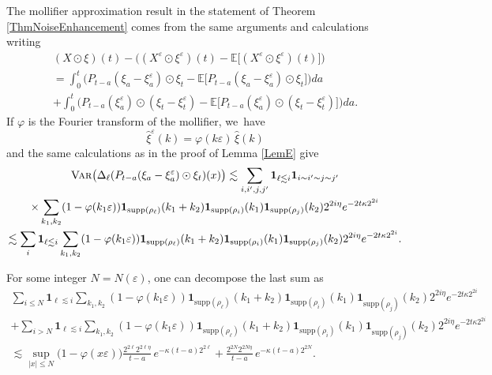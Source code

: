 \documentclass[10pt]{amsart}
\theoremstyle{definition}
\let\epsilon\varepsilon
\let\eps\epsilon
\newcommand\bbE{\mathbb{E}}
\newcommand{\bfone}{\mathbf{1}}
\begin{document}
The mollifier approximation result in the statement of Theorem \ref{ThmNoiseEnhancement} comes from the same arguments and calculations writing
\begin{multline*}
(X\odot\xi)(t) - \bigl((X^\eps\odot\xi^\eps)(t) - \bbE\bigl[(X^\eps\odot\xi^\eps)(t) \bigr]\bigr)
\\
= \int_0^t \bigl(P_{t-a}(\xi_a - \xi_a^{\eps})\odot \xi_t - \bbE\bigl[P_{t-a}(\xi_a - \xi_a^{\eps})\odot \xi_t\bigr]\bigr) da
\\
+ \int_0^t \bigl(P_{t-a}(\xi_a^\eps)\odot (\xi_t-\xi_t^\eps) - \bbE\bigl[P_{t-a}(\xi_a^\eps) \odot (\xi_t-\xi_t^\eps)\bigr]\bigr) da.
\end{multline*}
If $\varphi$ is the Fourier transform of the mollifier, we~have
\[
\widehat\xi^\eps(k)=\varphi(k\eps) \, \widehat{\xi}(k)
\]
and the same calculations as in the proof of Lemma \ref{LemE} give
\begin{multline*}
\textsc{{Var}}\bigl(\Delta_\ell(P_{t-a}(\xi_a - \xi_a^\eps)\odot\xi_t)(x)\bigr) \lesssim \sum_{i,i',j,j'} \bfone_{\ell\lesssim i}\bfone_{i\sim i' \sim j \sim j'}
\\
\times\sum_{k_1,k_2} (1-\varphi(k_1\eps))\bfone_{\text{supp}(\rho_\ell)}(k_1+k_2) \bfone_{\text{supp}(\rho_i)}(k_1)\bfone_{\text{supp}(\rho_j)}(k_2)2^{2 i \eta}e^{-2t\kappa 2^{2i}}
\\
\lesssim
\sum_{i} \bfone_{\ell\lesssim i} \sum_{k_1,k_2} (1-\varphi(k_1\eps))\bfone_{\text{supp}(\rho_\ell)}(k_1+k_2) \bfone_{\text{supp}(\rho_i)}(k_1)\bfone_{\text{supp}(\rho_j)}(k_2)2^{2 i \eta}e^{-2t\kappa 2^{2i}}.
\end{multline*}
\par\noindent
\begin{minipage}{\textwidth}
For some integer $N=N(\eps)$, one can decompose the last sum as
\begin{multline*}
\sum_{i\leq N} \bfone_{\ell\lesssim i} \sum_{k_1,k_2} (1-\varphi(k_1\eps))\bfone_{\text{supp}(\rho_\ell)}(k_1+k_2) \bfone_{\text{supp}(\rho_i)}(k_1)\bfone_{\text{supp}(\rho_j)}(k_2)2^{2 i \eta}e^{-2t\kappa 2^{2i}}
\\
+\sum_{i> N} \bfone_{\ell\lesssim i} \sum_{k_1,k_2} (1-\varphi(k_1\eps))\bfone_{\text{supp}(\rho_\ell)}(k_1+k_2) \bfone_{\text{supp}(\rho_i)}(k_1)\bfone_{\text{supp}(\rho_j)}(k_2)2^{2 i \eta}e^{-2t\kappa 2^{2i}}
\\
\lesssim \sup_{|x|\leq N}\bigl(1-\varphi(x\eps)\bigr) \frac{2^{2\ell}2^{2\ell\eta}}{t-a} \, e^{-\kappa(t-a)2^{2\ell}} + \frac{2^{2N}2^{2N\eta}}{t-a} \, e^{-\kappa(t-a)2^{2N}}.
\end{multline*}
\end{minipage}
\end{document}
